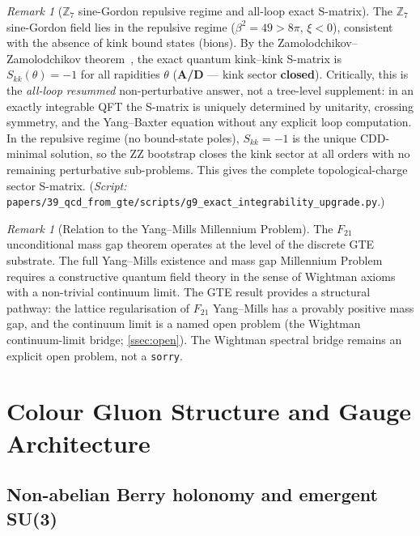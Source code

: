 \documentclass[11pt]{article}
\theoremstyle{remark}
\newtheorem{remark}[theorem]{Remark}
\newcommand{\ZS}{\mathbb{Z}_7}
\newcommand{\Ftwentyone}{F_{21}}
\newcommand{\CatAD}{\textbf{A/D}}
\begin{document}
\begin{remark}[$\ZS$ sine-Gordon repulsive regime and all-loop exact S-matrix]
\label{rem:repulsive}
The $\ZS$ sine-Gordon field lies in the repulsive regime ($\beta^2 = 49 > 8\pi$,
$\xi < 0$), consistent with the absence of kink bound states (bions).
By the Zamolodchikov--Zamolodchikov theorem~\cite{ZamolodchikovZamolodchikov1979}, the exact
quantum kink--kink S-matrix is $S_{kk}(\theta) = -1$ for all rapidities $\theta$
(\CatAD{} — kink sector \textbf{closed}).
Critically, this is the \emph{all-loop resummed} non-perturbative answer, not a
tree-level supplement: in an exactly integrable QFT the S-matrix is uniquely
determined by unitarity, crossing symmetry, and the Yang--Baxter equation without
any explicit loop computation.  In the repulsive regime (no bound-state poles),
$S_{kk} = -1$ is the unique CDD-minimal solution, so the ZZ bootstrap closes the
kink sector at all orders with no remaining perturbative sub-problems.
This gives the complete topological-charge sector S-matrix.
(\textit{Script:} \texttt{papers/39\_qcd\_from\_gte/scripts/g9\_exact\_integrability\_upgrade.py}.)
\end{remark}

\begin{remark}[Relation to the Yang--Mills Millennium Problem]
The $\Ftwentyone$ unconditional mass gap theorem operates at the level of the
discrete GTE substrate.
The full Yang--Mills existence and mass gap Millennium Problem requires a
constructive quantum field theory in the sense of Wightman axioms with a
non-trivial continuum limit.
The GTE result provides a structural pathway: the lattice regularisation of
$\Ftwentyone$ Yang--Mills has a provably positive mass gap, and the continuum
limit is a named open problem (the Wightman continuum-limit bridge; \cref{ssec:open}).
The Wightman spectral bridge remains an explicit open problem, not a
\texttt{sorry}.
\end{remark}

\section{Colour Gluon Structure and Gauge Architecture}
\label{sec:colour}

\subsection{Non-abelian Berry holonomy and emergent SU(3)}
\label{ssec:berry}
\end{document}
